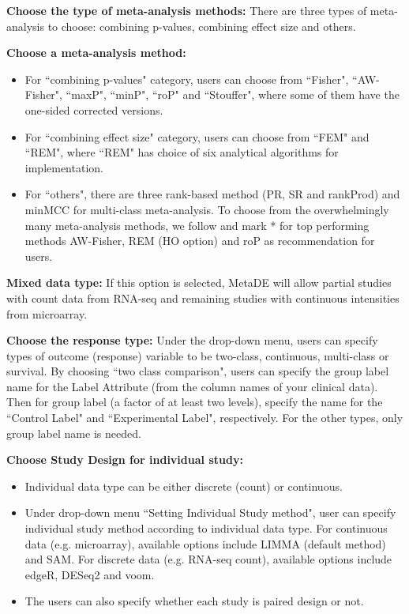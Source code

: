\begin{steps}
\item \textbf{Choose the type of meta-analysis methods:}
There are three types of meta-analysis to choose:
combining p-values, combining effect size and others.

\item \textbf{Choose a meta-analysis method:}
\begin{itemize}
\item For ``combining p-values" category,
users can choose from ``Fisher", ``AW-Fisher", ``maxP", ``minP", ``roP" and ``Stouffer",
where some of them have the one-sided corrected versions.

\item For ``combining effect size" category,
users can choose from ``FEM" and ``REM",
where ``REM" has choice of six analytical algorithms for implementation.

\item For ``others",
there are three rank-based method (PR, SR and rankProd) and minMCC for multi-class meta-analysis.
To choose from the overwhelmingly many meta-analysis methods,
we follow \cite{chang2013meta} and mark * for top performing methods AW-Fisher, REM (HO option) and roP as recommendation for users.
\end{itemize}

\item \textbf{Mixed data type:}
If this option is selected,
MetaDE will allow partial studies with count data from RNA-seq and remaining studies with continuous intensities from microarray.

\item \textbf{Choose the response type:}
Under the drop-down menu,
users can specify types of outcome (response) variable to be two-class, continuous, multi-class or survival.
By choosing ``two class comparison",
users can specify the group label name for the Label Attribute (from the column names of your clinical data).
Then for group label (a factor of at least two levels),
specify the name for the ``Control Label" and ``Experimental Label", respectively.
For the other types, only group label name is needed.

\item \textbf{Choose Study Design for individual study:}
\begin{itemize}
\item Individual data type can be either discrete (count) or continuous.
\item Under drop-down menu ``Setting Individual Study method", user can specify  individual study method according to individual data type.
For continuous data (e.g. microarray), available options include LIMMA (default method) and SAM.
For discrete data (e.g. RNA-seq count), available options include edgeR, DESeq2 and voom.
\item The users can also specify whether each study is paired design or not.
\end{itemize}


\end{steps}
